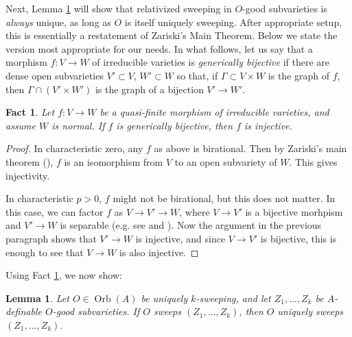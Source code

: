 \documentclass{amsart}
\newtheorem{fact}[theorem]{Fact}
\newtheorem{lemma}[theorem]{Lemma}
\theoremstyle{definition}
\begin{document}
Next, Lemma \ref{L: relativized sweeping is unique} will show that relativized sweeping in $O$-good subvarieties is \textit{always} unique, as long as $O$ is itself uniquely sweeping. After appropriate setup, this is essentially a restatement of Zariski's Main Theorem. Below we state the version most appropriate for our needs. In what follows, let us say that a morphism $f:V\rightarrow W$ of irreducible varieties is \textit{generically bijective} if there are dense open subvarieties $V'\subset V$, $W'\subset W$ so that, if $\Gamma\subset V\times W$ is the graph of $f$, then $\Gamma\cap(V'\times W')$ is the graph of a bijection $V'\rightarrow W'$.

\begin{fact}\label{F: ZMT}
    Let $f:V\rightarrow W$ be a quasi-finite morphism of irreducible varieties, and assume $W$ is normal. If $f$ is generically bijective, then $f$ is injective.
\end{fact}
\begin{proof}
    In characteristic zero, any $f$ as above is birational. Then by Zariski's main theorem (\cite[Corollaire 18.12.13]{ega4}), $f$ is an isomorphism from $V$ to an open subvariety of $W$. This gives injectivity.
    
    In characteristic $p>0$, $f$ might not be birational, but this does not matter. In this case, we can factor $f$ as $V\rightarrow V'\rightarrow W$, where $V\rightarrow V'$ is a bijective morhpism and $V'\rightarrow W$ is separable (e.g. see \cite[Section 1.2]{ezfields} and \cite[Lemma 9.26]{CasHasYe}). Now the argument in the previous paragraph shows that $V'\rightarrow W$ is injective, and since $V\rightarrow V'$ is bijective, this is enough to see that $V\rightarrow W$ is also injective.
\end{proof}

Using Fact \ref{F: ZMT}, we now show:

\begin{lemma}\label{L: relativized sweeping is unique}
    Let $O\in\operatorname{Orb}(A)$ be uniquely $k$-sweeping, and let $Z_1,...,Z_k$ be $A$-definable $O$-good subvarieties. If $O$ sweeps $(Z_1,...,Z_k)$, then $O$ uniquely sweeps $(Z_1,...,Z_k)$.
\end{lemma}
\end{document}
